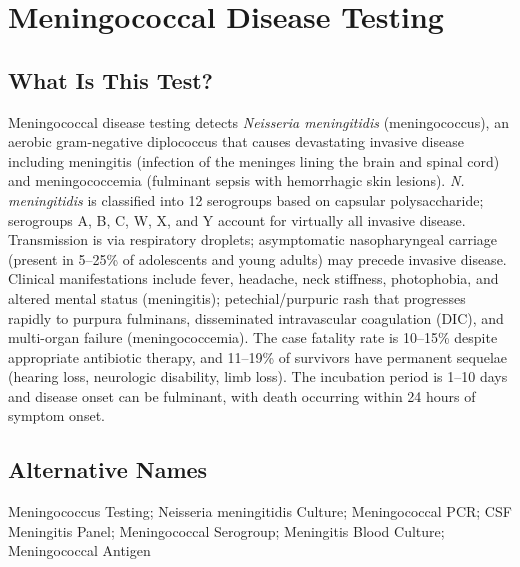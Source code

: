 \chapter{Meningococcal Disease Testing}

\section*{What Is This Test?}
Meningococcal disease testing detects \textit{Neisseria meningitidis} (meningococcus), an aerobic gram-negative diplococcus that causes devastating invasive disease including meningitis (infection of the meninges lining the brain and spinal cord) and meningococcemia (fulminant sepsis with hemorrhagic skin lesions). \textit{N. meningitidis} is classified into 12 serogroups based on capsular polysaccharide; serogroups A, B, C, W, X, and Y account for virtually all invasive disease. Transmission is via respiratory droplets; asymptomatic nasopharyngeal carriage (present in 5--25\% of adolescents and young adults) may precede invasive disease. Clinical manifestations include fever, headache, neck stiffness, photophobia, and altered mental status (meningitis); petechial/purpuric rash that progresses rapidly to purpura fulminans, disseminated intravascular coagulation (DIC), and multi-organ failure (meningococcemia). The case fatality rate is 10--15\% despite appropriate antibiotic therapy, and 11--19\% of survivors have permanent sequelae (hearing loss, neurologic disability, limb loss). The incubation period is 1--10 days and disease onset can be fulminant, with death occurring within 24 hours of symptom onset.

\section*{Alternative Names}
Meningococcus Testing; Neisseria meningitidis Culture; Meningococcal PCR; CSF Meningitis Panel; Meningococcal Serogroup; Meningitis Blood Culture; Meningococcal Antigen

